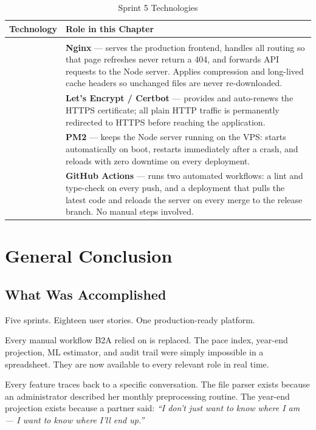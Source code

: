 \documentclass[12pt,a4paper]{report}
\newcommand{\logoplace}[1]{%
  \begin{tikzpicture}[baseline=-0.5ex]
    \node[fill=logobg, draw=logoborder, rounded corners=4pt,
          inner xsep=6pt, inner ysep=4pt,
          minimum width=2.4cm, minimum height=0.75cm,
          font=\bfseries\footnotesize\color{accentgray}] {#1};
  \end{tikzpicture}%
}
\newenvironment{techtable}[2]{%
  \begin{longtable}{>{\centering\arraybackslash}p{2.6cm} p{11cm}}
  \caption{#1}\label{#2}\\
  \toprule\textbf{Technology} & \textbf{Role in this Chapter}\\\midrule\endhead
  \midrule\multicolumn{2}{r}{\small\itshape Continued\ldots}\\\endfoot
  \bottomrule\endlastfoot
}{%
  \end{longtable}%
}
\begin{document}
\begin{techtable}{Sprint 5 Technologies}{tab:tech-sprint5}

  \logoplace{Nginx} &
  \textbf{Nginx} --- serves the production frontend, handles all routing so that
  page refreshes never return a 404, and forwards API requests to the Node server.
  Applies compression and long-lived cache headers so unchanged files are never
  re-downloaded.\\[6pt]

  \logoplace{Let's Encrypt} &
  \textbf{Let's Encrypt / Certbot} --- provides and auto-renews the HTTPS certificate;
  all plain HTTP traffic is permanently redirected to HTTPS before reaching the
  application.\\[6pt]

  \logoplace{PM2} &
  \textbf{PM2} --- keeps the Node server running on the VPS: starts automatically
  on boot, restarts immediately after a crash, and reloads with zero downtime on
  every deployment.\\[6pt]

  \logoplace{GitHub Actions} &
  \textbf{GitHub Actions} --- runs two automated workflows: a lint and type-check
  on every push, and a deployment that pulls the latest code and reloads the server
  on every merge to the release branch. No manual steps involved.\\

\end{techtable}

\chapter{General Conclusion}

\section{What Was Accomplished}

Five sprints. Eighteen user stories. One production-ready platform.

Every manual workflow B2A relied on is replaced. The pace index, year-end projection,
ML estimator, and audit trail were simply impossible in a spreadsheet. They are now
available to every relevant role in real time.

Every feature traces back to a specific conversation. The file parser exists because
an administrator described her monthly preprocessing routine. The year-end projection
exists because a partner said: \textit{``I don't just want to know where I am --- I
want to know where I'll end up.''}
\end{document}
